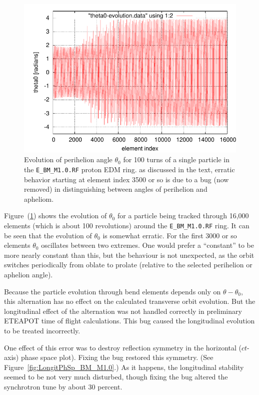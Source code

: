 \documentclass[]{article}
\begin{document}
%
\begin{figure}[h]
\centering
\includegraphics[scale=0.8]{pdf/theta0-evolution-eps-converted-to.pdf}
\caption{\label{fig:theta0-evolution}Evolution of perihelion angle $\theta_0$
for 100 turns of a single particle in the {\tt E\_BM\_M1.0.RF} proton EDM ring.
as discussed in the text, erratic behavior starting at element index 3500 or so 
is due to a bug (now removed) in distinguishing between angles of perihelion 
and apheliom.}
\end{figure}
%
Figure~(\ref{fig:theta0-evolution}) shows the evolution
of $\theta_0$ for a particle being tracked through 16,000 elements
(which is about 100 revolutions) around the {\tt E\_BM\_M1.0.RF} ring. 
It can be seen that the evolution of $\theta_0$ is somewhat erratic.
For the first 3000 or so elements $\theta_0$ oscillates between two
extremes. One would prefer a ``constant'' to be more nearly constant than this,
but the behaviour is not unexpected, as the orbit switches periodically from
oblate to prolate (relative to the selected perihelion or aphelion angle).

Because the particle evolution through bend elements depends only
on $\theta-\theta_0$, this alternation has no effect on the calculated
transverse orbit evolution. But the longitudinal effect of the alternation 
was not handled correctly in preliminary ETEAPOT time of flight calculations. 
This bug caused the longitudinal evolution to be treated incorrectly. 

One effect of this error was to destroy reflection symmetry in the horizontal
($ct$-axis) phase space plot). Fixing the bug restored this symmetry. 
(See Figure~\ref{fig:LongitPhSp_BM_M1.0}.) As it happens, the longitudinal 
stability seemed to be not very much disturbed, though fixing the bug altered 
the synchrotron tune by about 30 percent.
\end{document}
